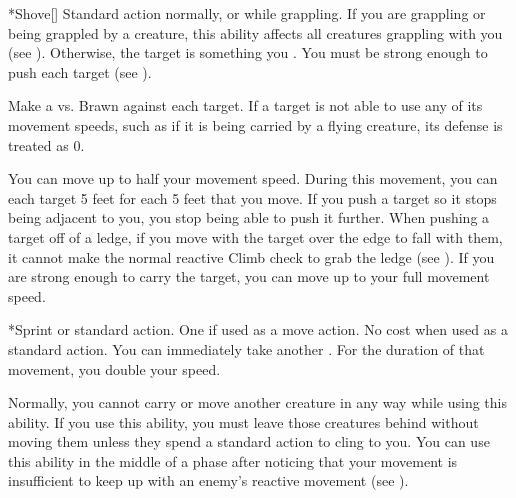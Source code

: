   \begin{activeability}*{Shove}[]
    \abilityusagetime Standard action normally, or  while grappling.
    \rankline
    If you are grappling or being grappled by a creature, this ability affects all creatures grappling with you (see ).
    Otherwise, the target is something you .
    You must be strong enough to push each target (see ).

    Make a  vs. Brawn against each target.
    If a target is not able to use any of its movement speeds, such as if it is being carried by a flying creature, its defense is treated as 0.

    \hit You can move up to half your movement speed.
    During this movement, you can  each target 5 feet for each 5 feet that you move.
    If you push a target so it stops being adjacent to you, you stop being able to push it further.
    When pushing a target off of a ledge, if you move with the target over the edge to fall with them, it cannot make the normal reactive Climb check to grab the ledge (see ).
    \crit If you are strong enough to carry the target, you can move up to your full movement speed.
  \end{activeability}

  \begin{activeability}*{Sprint}
    \abilityusagetime {} or standard action.
    \abilitycost One  if used as a move action. No cost when used as a standard action.
    \rankline
    You can immediately take another .
    For the duration of that movement, you double your speed.

    Normally, you cannot carry or move another creature in any way while using this ability.
    If you use this ability, you must leave those creatures behind without moving them unless they spend a standard action to cling to you.
    You can use this ability in the middle of a phase after noticing that your movement is insufficient to keep up with an enemy's reactive movement (see ).
  \end{activeability}

